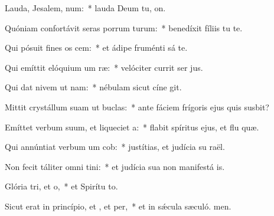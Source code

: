 \item Lauda, Jesalem, num:~* lauda Deum tu, on.
\item Quóniam confortávit seras porrum turum:~* benedíxit fíliis tu  te.
\item Qui pósuit fines os cem:~* et ádipe fruménti sá te.
\item Qui emíttit elóquium um ræ:~* velóciter currit ser jus.
\item Qui dat nivem ut nam:~* nébulam sicut cíne git.
\item Mittit crystállum suam ut buclas:~* ante fáciem frígoris ejus quis susbit?
\item Emíttet verbum suum, et liqueciet a:~* flabit spíritus ejus, et flu quæ.
\item Qui annúntiat verbum um cob:~* justítias, et judícia su raël.
\item Non fecit táliter omni tini:~* et judícia sua non manifestá is.
\item Glória tri, et o,~* et Spirítu to.
\item Sicut erat in princípio, et , et per,~* et in sǽcula sæculó. men.
